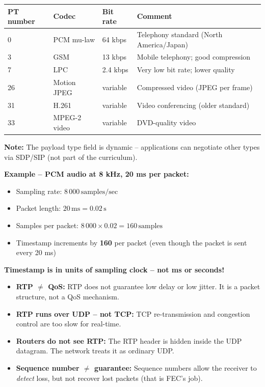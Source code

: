 \begin{tcolorbox}[keybox, title=RTP Payload Types -- Common codecs]
\begin{center}
\begin{tabular}{p{2cm}p{3.5cm}p{2.5cm}p{5cm}}
\toprule
\textbf{PT number} & \textbf{Codec} & \textbf{Bit rate} & \textbf{Comment} \\
\midrule
0 & PCM mu-law & 64 kbps & Telephony standard (North America/Japan) \\
3 & GSM & 13 kbps & Mobile telephony; good compression \\
7 & LPC & 2.4 kbps & Very low bit rate; lower quality \\
26 & Motion JPEG & variable & Compressed video (JPEG per frame) \\
31 & H.261 & variable & Video conferencing (older standard) \\
33 & MPEG-2 video & variable & DVD-quality video \\
\bottomrule
\end{tabular}
\end{center}

\medskip
\textbf{Note:} The payload type field is dynamic -- applications can negotiate other types via SDP/SIP (not part of the curriculum).
\end{tcolorbox}

\begin{tcolorbox}[formulabox, title=RTP Timestamp -- Calculation]
\textbf{Example -- PCM audio at 8 kHz, 20 ms per packet:}

\begin{itemize}[nosep]
  \item Sampling rate: $8\,000\,\text{samples/sec}$
  \item Packet length: $20\,\text{ms} = 0.02\,\text{s}$
  \item Samples per packet: $8\,000 \times 0.02 = 160\,\text{samples}$
  \item Timestamp increments by \textbf{160} per packet (even though the packet is sent every 20 ms)
\end{itemize}

\medskip
\textbf{Timestamp is in units of sampling clock -- not ms or seconds!}
\end{tcolorbox}

\begin{tcolorbox}[warnbox, title=Common misconceptions about RTP]
\begin{itemize}[nosep]
  \item \textbf{RTP $\neq$ QoS:} RTP does not guarantee low delay or low jitter. It is a packet structure, not a QoS mechanism.
  \item \textbf{RTP runs over UDP -- not TCP:} TCP re-transmission and congestion control are too slow for real-time.
  \item \textbf{Routers do not see RTP:} The RTP header is hidden inside the UDP datagram. The network treats it as ordinary UDP.
  \item \textbf{Sequence number $\neq$ guarantee:} Sequence numbers allow the receiver to \emph{detect} loss, but not recover lost packets (that is FEC's job).
\end{itemize}
\end{tcolorbox}

